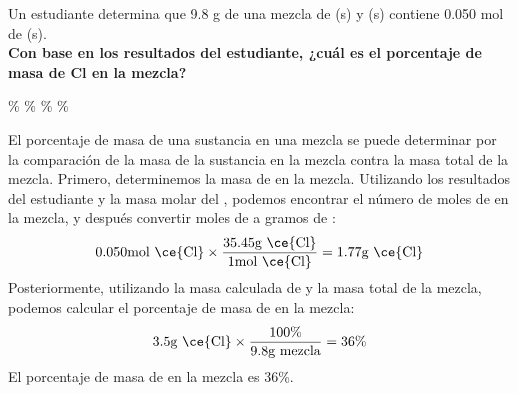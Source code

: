 Un estudiante determina que 9.8 g de una mezcla de (s) y (s) contiene 0.050 mol de (s).\\
\textbf{Con base en los resultados del estudiante, ¿cuál es el porcentaje de masa de Cl en la mezcla?}\\

\begin{oneparchoices}
    \%
    \%
    \%
    \%
\end{oneparchoices}

\begin{solutionbox}{6cm}
    El porcentaje de masa de una sustancia en una mezcla se puede determinar por la comparación de la masa de la sustancia en la mezcla contra la masa total de la mezcla.
    Primero, determinemos la masa de  en la mezcla. Utilizando los resultados del estudiante y la masa molar del , podemos encontrar el número de moles de  en la mezcla, y después convertir moles de  a gramos de :
    \[0.050\text{mol \ce{Cl}} \times \frac{35.45\text{g \ce{Cl}}}{1\text{mol \ce{Cl}}} = 1.77 \text{g \ce{Cl}}\]
    Posteriormente, utilizando la masa calculada de  y la masa total de la mezcla, podemos calcular el porcentaje de masa de  en la mezcla: 
    \[3.5\text{g \ce{Cl}} \times \frac{100\%}{9.8\text{g mezcla}} = 36\%\]
    El porcentaje de masa de  en la mezcla es 36\%.
    \end{solutionbox}
